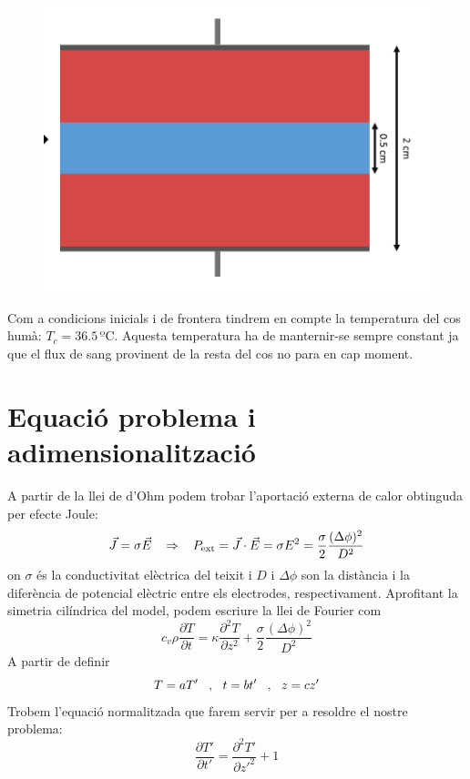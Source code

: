 \documentclass{article}
\begin{document}
\begin{figure}[h]
    \centering
    \includegraphics[width = 0.4\linewidth]{images/esquema_temp.png}
\end{figure}

Com a condicions inicials i de frontera tindrem en compte la temperatura del cos humà: \(T_c = 36.5\,\text{ºC}\). Aquesta temperatura ha de manternir-se sempre constant ja que el flux de sang provinent de la resta del cos no para en cap moment.
\section{Equació problema i adimensionalització}
A partir de la llei de d'Ohm podem trobar l'aportació externa de calor obtinguda per efecte Joule:
\begin{equation*}
    \vec{J} = \sigma\vec{E} \hspace{0.3cm} \Rightarrow \hspace{0.3cm} P_{\text{ext}} = \vec{J}\cdot\vec{E} = \sigma E^2 = \frac{\sigma}{2} \frac{(\Delta \phi)^2}{D^2}
\end{equation*}
on $\sigma$ és la conductivitat elèctrica del teixit i $D$ i $\Delta \phi$ son la distància i la diferència de potencial elèctric entre els electrodes, respectivament. Aprofitant la simetria cilíndrica del model, podem escriure la llei de Fourier com
\begin{equation*}
    c_{v}\rho \frac{\partial T}{\partial t} = \kappa \frac{\partial ^2 T}{\partial z^2} + \frac{\sigma}{2} \frac{(\Delta \phi)^2}{D^2}
\end{equation*}
A partir de definir
\begin{equation*}
    T = aT' \hspace{0.3cm} \text{,} \hspace{0.3cm} t = bt' \hspace{0.3cm} \text{,} \hspace{0.3cm} z = cz'
\end{equation*}
Trobem l'equació normalitzada que farem servir per a resoldre el nostre problema:
\begin{equation*}\label{EDP_norm}
    \frac{\partial T'}{\partial t'} = \frac{\partial ^2 T'}{\partial z'^2} + 1 
\end{equation*}
\end{document}
